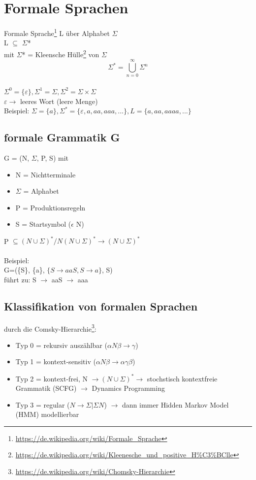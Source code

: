 \section{Formale Sprachen}

Formale Sprache\footnote{\url{https://de.wikipedia.org/wiki/Formale\_Sprache}}
L über Alphabet $\Sigma$\\
L $\subseteq$ $\Sigma$*\\
mit $\Sigma$* = Kleensche Hülle\footnote{\url{https://de.wikipedia.org/wiki/Kleenesche\_und\_positive\_H\%C3\%BClle}} von $\Sigma$\\


$$\Sigma^* = \bigcup_{n=0}^{\infty} \Sigma^{n}$$\\
$\Sigma^0 = \{\varepsilon\}, \Sigma^1 = \Sigma, \Sigma^2 = \Sigma \times \Sigma$\\
$\varepsilon \to$ leeres Wort (leere Menge)\\

Beispiel: $\Sigma = \{a\}, \Sigma^*=\{\varepsilon, a, aa, aaa, ...\}, L = \{a, aa, aaaa, ...\}$

\subsection{formale Grammatik G}

G = (N, $\Sigma$, P, S) mit\\
\begin{itemize}
	\item N = Nichtterminale
	\item $\Sigma$ = Alphabet
	\item P = Produktionsregeln
	\item S = Startsymbol ($\epsilon$ N)
\end{itemize}

P $\subseteq (N \cup \Sigma)^* / N(N \cup \Sigma)^* \to (N \cup \Sigma)^*$\\
\\
Beispiel:\\
G=(\{S\}, \{a\}, $\{S \to aaS, S \to a\}$, S)\\
führt zu: S $\to$ aaS $\to$ aaa

\subsection{Klassifikation von formalen Sprachen}
durch die Comsky-Hierarchie\footnote{\url{https://de.wikipedia.org/wiki/Chomsky-Hierarchie}}:
\begin{itemize}
	\item Typ 0 = rekursiv auszählbar ($\alpha N \beta \to \gamma$)
	\item Typ 1 = kontext-sensitiv ($\alpha N \beta \to \alpha \gamma \beta$)
	\item Typ 2 = kontext-frei, N $\to (N \cup \Sigma)^* \to$ stochstisch kontextfreie Grammatik (SCFG) $\to$ Dynamics Programming
	\item Typ 3 = regular ($N \to \Sigma | \Sigma N$) $\to$ dann immer Hidden Markov Model (HMM) modellierbar
\end{itemize}

